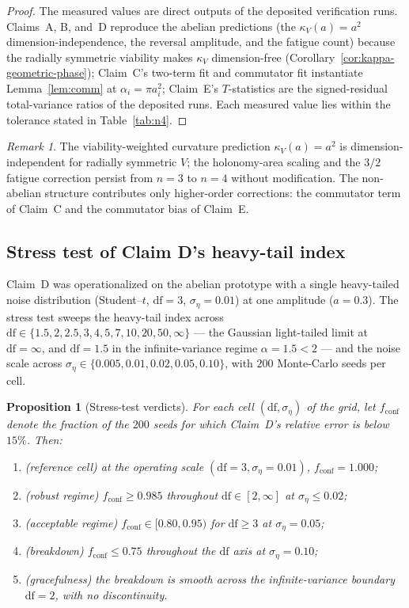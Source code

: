 \documentclass[11pt,a4paper]{article}
\theoremstyle{plain}
\newtheorem{proposition}[theorem]{Proposition}
\theoremstyle{definition}
\theoremstyle{remark}
\newtheorem{remark}[theorem]{Remark}
\newcommand{\kk}{\kappa_{\!V}}
\begin{document}
\begin{proof}
The measured values are direct outputs of the deposited
verification runs. Claims~A, B, and~D reproduce the abelian
predictions (the $\kk(a)=a^{2}$ dimension-independence, the
reversal amplitude, and the fatigue count) because the radially
symmetric viability makes $\kk$ dimension-free
(Corollary~\ref{cor:kappa-geometric-phase}); Claim~C's two-term
fit and commutator fit instantiate Lemma~\ref{lem:comm} at
$\alpha_i=\pi a_i^{2}$; Claim~E's $T$-statistics are the
signed-residual total-variance ratios of the deposited runs. Each
measured value lies within the tolerance stated in
Table~\ref{tab:n4}.
\end{proof}

\begin{remark}
The viability-weighted curvature prediction $\kk(a)=a^{2}$ is
dimension-independent for radially symmetric $V$; the
holonomy-area scaling and the $3/2$ fatigue correction persist
from $n=3$ to $n=4$ without modification. The non-abelian
structure contributes only higher-order corrections: the
commutator term of Claim~C and the commutator bias of Claim~E.
\end{remark}

\subsection{Stress test of Claim D's heavy-tail index}
\label{sec:verdict-stress}

Claim~D was operationalized on the abelian prototype with a single
heavy-tailed noise distribution (Student--$t$, $\mathrm{df}=3$,
$\sigma_\eta=0.01$) at one amplitude ($a=0.3$). The stress test
sweeps the heavy-tail index across
$\mathrm{df}\in\{1.5,2,2.5,3,4,5,7,10,20,50,\infty\}$ --- the
Gaussian light-tailed limit at $\mathrm{df}=\infty$, and
$\mathrm{df}=1.5$ in the infinite-variance regime $\alpha=1.5<2$
--- and the noise scale across
$\sigma_\eta\in\{0.005,0.01,0.02,0.05,0.10\}$, with $200$
Monte-Carlo seeds per cell.

\begin{proposition}[Stress-test verdicts]\label{prop:stress}
For each cell $(\mathrm{df},\sigma_\eta)$ of the grid, let
$f_{\mathrm{conf}}$ denote the fraction of the $200$ seeds for
which Claim~D's relative error is below $15\%$. Then:
\begin{enumerate}[leftmargin=*,itemsep=1pt]
\item (reference cell) at the operating scale
  $(\mathrm{df}=3,\sigma_\eta=0.01)$,
  $f_{\mathrm{conf}}=1.000$;
\item (robust regime) $f_{\mathrm{conf}}\geq0.985$ throughout
  $\mathrm{df}\in[2,\infty]$ at $\sigma_\eta\leq0.02$;
\item (acceptable regime) $f_{\mathrm{conf}}\in[0.80,0.95)$ for
  $\mathrm{df}\geq3$ at $\sigma_\eta=0.05$;
\item (breakdown) $f_{\mathrm{conf}}\leq0.75$ throughout the
  $\mathrm{df}$ axis at $\sigma_\eta=0.10$;
\item (gracefulness) the breakdown is smooth across the
  infinite-variance boundary $\mathrm{df}=2$, with no
  discontinuity.
\end{enumerate}
\end{proposition}
\end{document}
